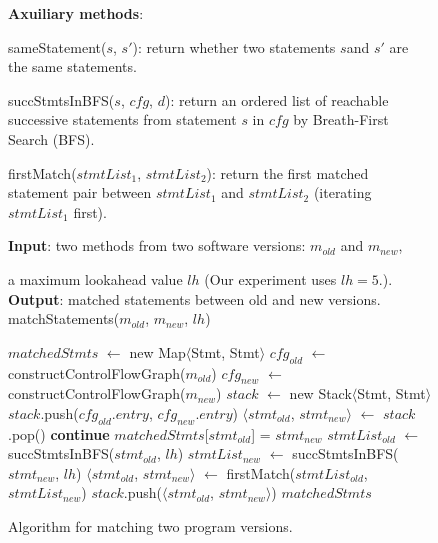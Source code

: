 \begin{figure}[t]
\textbf{Axuiliary methods}:

sameStatement($\mathit{s}$, $\mathit{s'}$): return whether two statements $\mathit{s}$and $\mathit{s'}$ are the same statements.

succStmtsInBFS($\mathit{s}$, $\mathit{cfg}$, $\mathit{d}$): return an ordered list of reachable successive statements from statement $\mathit{s}$ in $\mathit{cfg}$ by Breath-First Search (BFS).

firstMatch($\mathit{stmtList_1}$, $\mathit{stmtList_2}$): return the first matched statement pair between $\mathit{stmtList_1}$ and $\mathit{stmtList_2}$ (iterating $\mathit{stmtList_1}$ first).


\textbf{Input}: two methods from two software versions: $\mathit{m_{old}}$ and $m_{new}$,

\quad a maximum lookahead value $\mathit{lh}$ (Our experiment uses $\mathit{lh}=5$.).\\
\textbf{Output}: matched statements between old and new versions.
\vspace{-4mm}%
matchStatements($\mathit{m_{old}}$, $\mathit{m_{new}}$, $\mathit{lh}$)\\
\begin{algorithmic}[1]
\STATE $\mathit{matchedStmts}$ $\leftarrow$ new Map$\langle$Stmt, Stmt$\rangle$
\STATE $\mathit{cfg_{old}}$ $\leftarrow$ constructControlFlowGraph($\mathit{m_{old}}$)
\STATE $\mathit{cfg_{new}}$ $\leftarrow$ constructControlFlowGraph($\mathit{m_{new}}$)
\STATE $\mathit{stack}$ $\leftarrow$ new Stack$\langle$Stmt, Stmt$\rangle$
\STATE $\mathit{stack}$.push($\mathit{cfg_{old}}$.$\mathit{entry}$, $\mathit{cfg_{new}}$.$\mathit{entry}$)
\STATE $\langle$$\mathit{stmt_{old}}$, $\mathit{stmt_{new}}$$\rangle$ $\leftarrow$ $\mathit{stack}$.pop()
\STATE \textbf{continue}
\ENDIF
{}
\STATE $\mathit{matchedStmts}$[$\mathit{stmt_{old}}$] = $\mathit{stmt_{new}}$
\ELSE
\STATE $\mathit{stmtList_{old}}$ $\leftarrow$ succStmtsInBFS($\mathit{stmt_{old}}$, $\mathit{lh}$)
\STATE $\mathit{stmtList_{new}}$ $\leftarrow$ succStmtsInBFS($\mathit{stmt_{new}}$, $\mathit{lh}$)
\STATE $\langle$$\mathit{stmt_{old}}$, $\mathit{stmt_{new}}$$\rangle$ $\leftarrow$ firstMatch($\mathit{stmtList_{old}}$, $\mathit{stmtList_{new}}$)
\STATE $\mathit{stack}$.push($\langle$$\mathit{stmt_{old}}$, $\mathit{stmt_{new}}$$\rangle$)
\ENDIF
\ENDIF
\ENDWHILE
\RETURN $\mathit{matchedStmts}$
\end{algorithmic}
\vspace{-4mm}
\caption{Algorithm for matching two program versions.
\label{fig:matching}
}
\end{figure}
